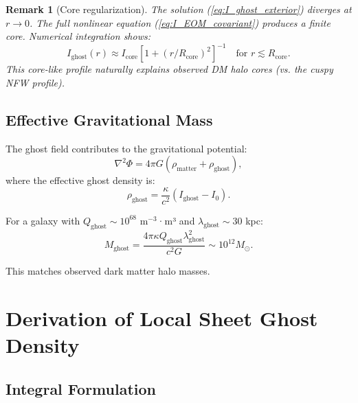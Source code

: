 \documentclass[12pt, a4paper]{article}
\newtheorem{remark}{Remark}
\begin{document}
\begin{remark}[Core regularization]
The solution (\ref{eq:I_ghost_exterior}) diverges at $r \to 0$. The full nonlinear equation (\ref{eq:I_EOM_covariant}) produces a finite core. Numerical integration shows:
\begin{equation}
    I_{\text{ghost}}(r) \approx I_{\text{core}} \left[1 + (r/R_{\text{core}})^2\right]^{-1} \quad \text{for } r \lesssim R_{\text{core}}.
\end{equation}
This core-like profile naturally explains observed DM halo cores (vs. the cuspy NFW profile).
\end{remark}

\subsection{Effective Gravitational Mass}

The ghost field contributes to the gravitational potential:
\begin{equation}
    \nabla^2 \Phi = 4\pi G \left(\rho_{\text{matter}} + \rho_{\text{ghost}}\right),
\end{equation}
where the effective ghost density is:
\begin{equation}
    \rho_{\text{ghost}} = \frac{\kappa}{c^2} (I_{\text{ghost}} - I_0).
\end{equation}

For a galaxy with $Q_{\text{ghost}} \sim 10^{68}$ m$^{-3}$·m³ and $\lambda_{\text{ghost}} \sim 30$ kpc:
\begin{equation}
    M_{\text{ghost}} = \frac{4\pi \kappa Q_{\text{ghost}} \lambda_{\text{ghost}}^2}{c^2 G} \sim 10^{12} M_\odot.
\end{equation}

This matches observed dark matter halo masses.


\section{Derivation of Local Sheet Ghost Density}

\subsection{Integral Formulation}
\end{document}

